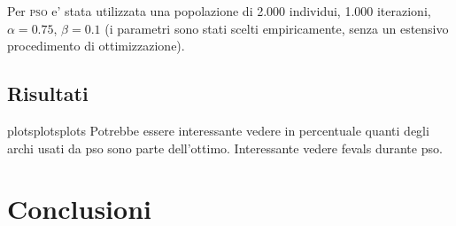 \documentclass[
12pt, %
a4paper, %
oneside, %
headinclude,footinclude, %
BCOR5mm, %
]{scrartcl}
\begin{document}
Per \textsc{pso} e' stata utilizzata una popolazione di 2.000 individui, 1.000 iterazioni, $\alpha = 0.75$, $\beta=0.1$ (i parametri sono stati scelti empiricamente, senza un estensivo procedimento di ottimizzazione).


\subsection{Risultati}
plotsplotsplots
Potrebbe essere interessante vedere in percentuale quanti degli archi usati da pso sono parte dell'ottimo. Interessante vedere fevals durante pso.
\section{Conclusioni}\label{sec:conclusioni}


\renewcommand{\refname}{\spacedlowsmallcaps{References}} %




\end{document}
